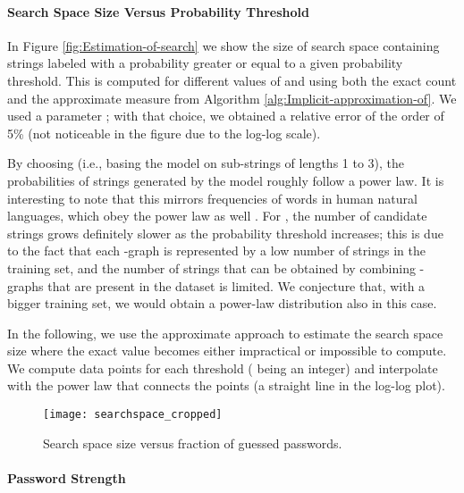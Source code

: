 \documentclass[a4paper,twocolumn]{article}
\begin{document}
\paragraph{Search Space Size Versus Probability Threshold}

In Figure \ref{fig:Estimation-of-search} we show the size of search
space containing strings labeled with a probability greater or equal
to a given probability threshold. This is computed for different values
of  and using both the exact count and the approximate measure
from Algorithm \ref{alg:Implicit-approximation-of}. We used a parameter
; with that choice, we obtained a relative error of the order
of 5\% (not noticeable in the figure due to the log-log scale).

By choosing  (i.e., basing the model on sub-strings
of lengths 1 to 3), the probabilities of strings generated by the
model roughly follow a power law. It is interesting to note that this
mirrors frequencies of words in human natural languages, which obey
the power law as well \cite{Zipf1949Human}. For , the number
of candidate strings grows definitely slower as the probability threshold
increases; this is due to the fact that each -graph is represented
by a low number of strings in the training set, and the number of
strings that can be obtained by combining -graphs that are present
in the dataset is limited. We conjecture that, with a bigger training
set, we would obtain a power-law distribution also in this case.

In the following, we use the approximate approach to estimate the
search space size where the exact value becomes either impractical
or impossible to compute. We compute data points for each 
threshold ( being an integer) and interpolate with the power law
that connects the points (a straight line in the log-log plot).

\begin{figure}
\begin{centering}
\texttt{[image: searchspace\_cropped]}
\par\end{centering}

\caption{\label{fig:Search-space}Search space size versus fraction of guessed
passwords.}



\end{figure}



\paragraph{Password Strength}
\end{document}
